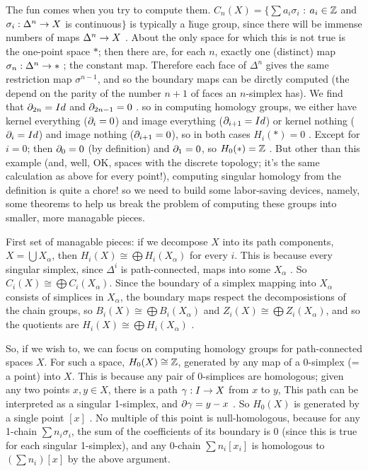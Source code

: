 The fun comes when you try to compute them. 
$C_n(X) = \{\sum a_i\sigma_i$ : $a_i\in {\Bbb Z}$ and $\sigma_i:\Delta^n\rightarrow X$ 
is continuous$\}$ is typically a \u{huge} group, since there will be immense
numbers of maps $\Delta^n\rightarrow X$ . About the only space for which this is not true is
the one-point space $*$; then there are, for each $n$, exactly one (distinct)
map $\sigma_n :\Delta^n\rightarrow *$ ; the constant map. Therefore each face of $\Delta^n$
gives the same restriction map $\sigma^{n-1}$, and so the boundary maps can 
be dirctly computed (the depend on the parity of the number $n+1$ of faces 
an $n$-simplex has). We find that $\partial_{2n}=Id$ and $\partial_{2n-1}=0$ . so in 
computing homology groups, we either have kernel everything ($\partial_i=0$) and
image everything ($\partial_{i+1}=Id$) or kernel nothing ($\partial_i=Id$) and
image nothing ($\partial_{i+1}=0$), so in both cases $H_i(*)=0$ . Except for $i=0$;
then $\partial_0=0$ (by definition) and $\partial_1=0$, so $H_0(*)={\Bbb Z}$ .
But other than this example (and, well, OK, spaces with the discrete topology;
it's the same calculation as above for every point!), computing singular 
homology from the definition is quite a chore! so we need to build
some labor-saving devices, namely, some theorems to help us break the problem
of computing these groups into smaller, more managable pieces.

\msk

First set of managable pieces: if we decompose $X$ into its path components, $X=\bigcup X_\alpha$,
then $H_i(X) \cong \bigoplus H_i(X_\alpha)$ for every $i$. This is because every singular simplex,
since $\Delta^i$ is path-connected, maps into some $X_\alpha$ . So $C_i(X) \cong \bigoplus C_i(X_\alpha)$.
Since the boundary of a simplex mapping into $X_\alpha$ consists of simplices in $X_\alpha$, the 
boundary maps respect the decomposistions of the chain groups, so 
$B_i(X) \cong \bigoplus B_i(X_\alpha)$ and $Z_i(X) \cong \bigoplus Z_i(X_\alpha)$, and so 
the quotients are $H_i(X) \cong \bigoplus H_i(X_\alpha)$ . 

\msk

So, if we wish to, we can focus on computing homology groups for path-connected spaces $X$. For such a space, 
$H_0(X)\cong {\Bbb Z}$, generated by any map of a 0-simplex (= a point) into $X$. This is because any pair
of 0-simplices are homologous; given any two points $x,y\in X$, there is a path $\gamma: I\rightarrow X$ from $x$ to $y$,
This path can be interpreted as a singular 1-simplex, and $\partial\gamma = y-x$ . So $H_0(X)$ is generated
by a single point $[x]$ . No multiple of this point is null-homologous, because for any 1-chain $\sum n_i \sigma_i$,
the sum of the coefficients of its boundary is 0 (since this is true for each singular 1-simplex), and any 0-chain
$\sum n_i [x_i]$ is homologous to $(\sum n_i)[x]$ by the above argument.

